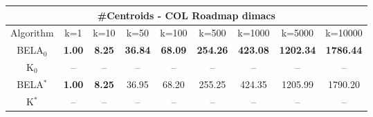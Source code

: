 \begin{tabular}{c|cccccccc}\toprule
\multicolumn{9}{c}{#Centroids - COL Roadmap dimacs}\\ \midrule
Algorithm & k=1 & k=10 & k=50 & k=100 & k=500 & k=1000 & k=5000 & k=10000 \\ \midrule
BELA$_0$ & \textbf{1.00} & \textbf{8.25} & \textbf{36.84} & \textbf{68.09} & \textbf{254.26} & \textbf{423.08} & \textbf{1202.34} & \textbf{1786.44} \\
K$_0$ & -- & -- & -- & -- & -- & -- & -- & -- \\
BELA$^*$ & \textbf{1.00} & \textbf{8.25} & 36.95 & 68.20 & 255.25 & 424.35 & 1205.99 & 1790.20 \\
K$^*$ & -- & -- & -- & -- & -- & -- & -- & -- \\ \bottomrule 
\end{tabular}
